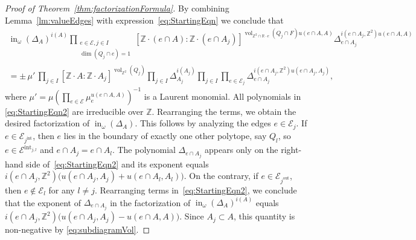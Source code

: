 \documentclass[11pt]{amsart}
\numberwithin{equation}{section}
\theoremstyle{plain}
\theoremstyle{definition}
\theoremstyle{remark}
\begin{document}
\begin{proof}[Proof of Theorem~\ref{thm:factorizationFormula}]
  By combining Lemma~\ref{lm:valueEdges} with
  expression~\eqref{eq:StartingEqn} we conclude that
  \begin{equation}
    \label{eq:StartingEqn2}
    \begin{split}
      \operatorname{in}_{\omega}(\Delta_A)^{i(A)}\!\!\!\!\!\!  \prod_{\substack{e\in
          \mathcal{E},j\in I\\ \dim(Q_j\cap e)=1}}
      \!\!\![{\mathbb{Z}}{\!\cdot\!}(e\cap A): {\mathbb{Z}}{\!\cdot\!}(e \cap
      A_j)]^{\operatorname{\operatorname{vol}}_{{\mathbb{Z}}^2\cap {\mathbb{R}}{\!\cdot\!} e}(Q_j\cap F)u(e\cap A,A)}
      \Delta_{e\cap A_j}^{i(e\cap A_j, {\mathbb{Z}}^2) u(e\cap A, A)}\\
      = \pm \,\mu'\,\prod_{j\in I}[{\mathbb{Z}}{\!\cdot\!} A: {\mathbb{Z}}{\!\cdot\!}
      A_j]^{\operatorname{\operatorname{vol}}_{{\mathbb{Z}}^2}(Q_j)} \prod_{j\in I}\Delta_{A_j}^{i(A_j)}
      \prod_{j\in I} \prod_{e\in \mathcal{E}_j} \Delta_{e\cap
        A_j}^{i(e \cap A_j, {\mathbb{Z}}^2) u(e\cap A_j,A_j)},
    \end{split}
  \end{equation}
  where ${\mu'}=\mu(\prod_{e\in \mathcal{E}} \mu_e^{u(e\cap A,
    A)})^{-1}$ is a Laurent monomial.  All polynomials in
  \eqref{eq:StartingEqn2} are irreducible over ${\mathbb{Z}}$. Rearranging the
  terms, we obtain the desired factorization of
  $\operatorname{in}_{\omega}(\Delta_A)$. This follows by analyzing the edges $e\in
  \mathcal{E}_j$. If $e\in \mathcal{E}_j^\operatorname{int}$, then $e$ lies in
  the boundary of exactly one other polytope, say $Q_l$, so $e\in
  \mathcal{E}^\operatorname{int}_{j,l}$ and $e\cap A_j=e\cap A_l$. The
  polynomial $\Delta_{e\cap A_j}$ appears only on the right-hand side
  of~\eqref{eq:StartingEqn2} and its exponent equals $i(e\cap
  A_j,{\mathbb{Z}}^2)\big(u(e\cap A_j,A_j)+u(e\cap A_l,A_l)\big)$.  On the
  contrary, if $e\in \mathcal{E}_j^\operatorname{out}$, then $e\notin
  \mathcal{E}_l$ for any $l\neq j$. Rearranging terms
  in~\eqref{eq:StartingEqn2}, we conclude that the exponent of
  $\Delta_{e\cap A_j}$ in the factorization of
  $\operatorname{in}_{\omega}(\Delta_A)^{i(A)}$ equals $i(e\cap
  A_j,{\mathbb{Z}}^2)\big(u(e\cap A_j,A_j)-u(e\cap A,A)\big)$. Since
  $A_j\subset A$, this quantity is non-negative by
  \eqref{eq:subdiagramVol}.


\end{proof}
\end{document}
